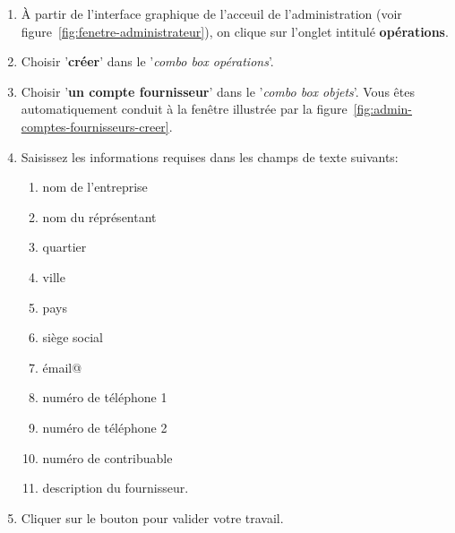\begin{enumerate}[1)]
	\item \`A partir de l'interface graphique de l'acceuil de
		l'administration (voir figure~\ref{fig:fenetre-administrateur}),
		on clique sur l'onglet intitul\'e \textbf{op\'erations}. 
		
	\item Choisir '\textbf{cr\'eer}' dans le '\emph{combo box
		op\'erations}'.
		
	\item Choisir '\textbf{un compte fournisseur}' dans
		le '\emph{combo box objets}'. Vous \^etes automatiquement
		conduit \`a la fen\^etre illustr\'ee par la
		figure~\ref{fig:admin-comptes-fournisseurs-creer}.
		
	\item Saisissez les informations requises dans les champs de texte
		suivants:
		\begin{enumerate}[1)]
			\item nom de l'entreprise \obligatoire
			\item nom du r\'epr\'esentant
			\item quartier
			\item ville 
			\item pays
			\item si\`ege social
			\item \'email@
			\item num\'ero de t\'el\'ephone 1
			\item num\'ero de t\'el\'ephone 2
			\item num\'ero de contribuable 
			\item description du fournisseur.
		\end{enumerate}
		
	\item Cliquer sur le bouton  pour
		valider votre travail.		
\end{enumerate}


\newpage
{}

